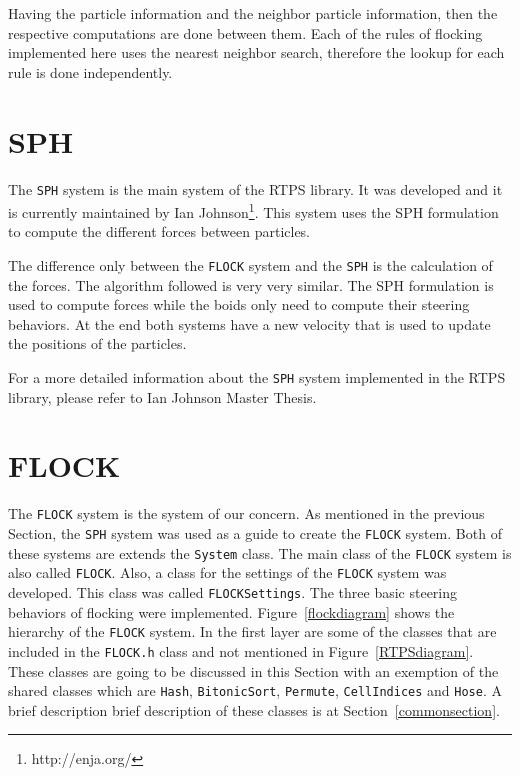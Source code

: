 Having the particle information and the neighbor particle information, then the respective computations are done between them. Each of the rules of flocking implemented here uses the nearest neighbor search, therefore the lookup for each rule is done independently.

\section{SPH}\label{sphsection}
The \texttt{SPH} system is the main system of the RTPS library. It was developed and it is currently maintained by Ian Johnson\footnote{http://enja.org/}\cite{ianPaper}. This system uses the SPH formulation to compute the different forces between particles.

The difference only between the \texttt{FLOCK} system and the \texttt{SPH} is the calculation of the forces. The algorithm followed is very very similar. The SPH formulation is used to compute forces while the boids only need to compute their steering behaviors. At the end both systems have a new velocity that is used to update the positions of the particles.

For a more detailed information about the \texttt{SPH} system implemented in the RTPS library, please refer to Ian Johnson Master Thesis\cite{ianThesis}.

\section{FLOCK}\label{flocksection}
The \texttt{FLOCK} system is the system of our concern. As mentioned in the previous Section, the \texttt{SPH} system was used as a guide to create the \texttt{FLOCK} system. Both of these systems are extends the \texttt{System} class. The main class of the \texttt{FLOCK} system is also called \texttt{FLOCK}. Also, a class for the settings of the \texttt{FLOCK} system was developed. This class was called \texttt{FLOCKSettings}. The three basic steering behaviors of flocking were implemented. Figure~\ref{flockdiagram} shows the hierarchy of the \texttt{FLOCK} system. In the first layer are some of the classes that are included in the \texttt{FLOCK.h} class and not mentioned in Figure~\ref{RTPSdiagram}. These classes are going to be discussed in this Section with an exemption of the shared classes which are \texttt{Hash}, \texttt{BitonicSort}, \texttt{Permute}, \texttt{CellIndices} and \texttt{Hose}. A brief description brief description of these classes is at Section~\ref{commonsection}.

